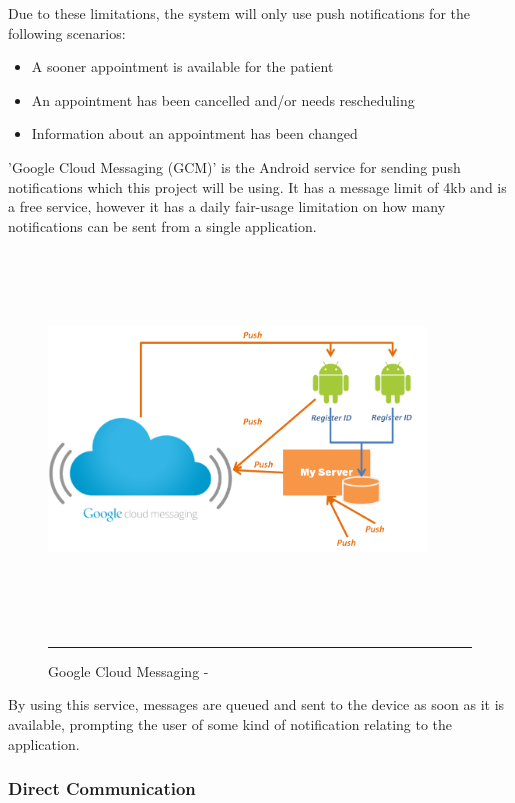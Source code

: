 Due to these limitations, the system will only use push notifications for the following scenarios:

\begin{itemize}
	\item A sooner appointment is available for the patient
	\item An appointment has been cancelled and/or needs rescheduling
	\item Information about an appointment has been changed
\end{itemize}

'Google Cloud Messaging (GCM)' is the Android service for sending push notifications which this project will be using. It has a message limit of 4kb and is a free service, however it has a daily fair-usage limitation on how many notifications can be sent from a single application.

\begin{figure}[htbp]
	\centering
\includegraphics[width=10cm,height=10cm,keepaspectratio]{Figures/gcm.png}
		\rule{35em}{0.5pt}
	\caption[Google Cloud Messaging - \cite{gcm}]{Google Cloud Messaging - \cite{gcm}}
	\label{fig:gcm}
\end{figure}

By using this service, messages are queued and sent to the device as soon as it is available, prompting the user of some kind of notification relating to the application.

\subsubsection{Direct Communication}

